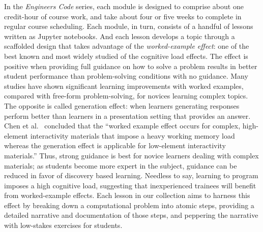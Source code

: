 \documentclass[10pt,journal,compsoc]{IEEEtran}
\begin{document}
In the \emph{Engineers Code} series, each module is designed to comprise about one credit-hour of course work, and take about four or five weeks to complete in regular course scheduling. 
Each module, in turn, consists of a handful of lessons written as Jupyter notebooks. 
And each lesson develops a topic through a scaffolded design that takes advantage of the \emph{worked-example effect}: one of the best known and most widely studied of the cognitive load effects. 
The effect is positive when providing full guidance on how to solve a problem results in better student performance than problem-solving conditions with no guidance. 
Many studies have shown significant learning improvements with worked examples, compared with free-form problem-solving, for novices learning complex topics.
The opposite is called generation effect: 
when learners generating responses perform better than learners in a presentation setting that provides an answer. 
Chen et al.\ \cite{chen2015worked} concluded that the ``worked example effect occurs for complex, high-element interactivity materials that impose a heavy working memory load whereas the generation effect is applicable for low-element interactivity materials.''
Thus, strong guidance is best for novice learners dealing with complex materials; as students become more expert in the subject, guidance can be reduced in favor of discovery based learning. 
Needless to say, learning to program imposes a high cognitive load, suggesting that inexperienced trainees will benefit from worked-example effects. 
Each lesson in our collection aims to harness this effect by breaking down a computational problem into atomic steps, providing a detailed narrative and documentation of those steps, and peppering the narrative with low-stakes exercises for students. 
\end{document}
